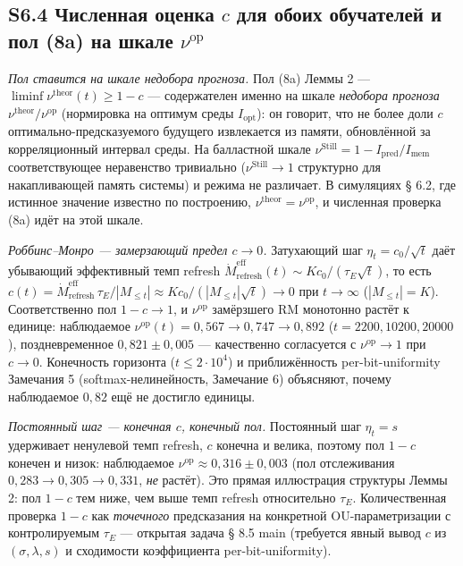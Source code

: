 \documentclass[pdflatex,sn-mathphys-ay]{sn-jnl}
\begin{document}
\subsection*{\texorpdfstring{S6.4 Численная оценка \(c\) для обоих обучателей и пол (8a) на шкале \(\nu^{\text{op}}\)}{S6.4 Численная оценка c для обоих обучателей и пол (8a) на шкале \textbackslash nu\^{}\{\textbackslash text\{op\}\}}}\label{s6.4-ux447ux438ux441ux43bux435ux43dux43dux430ux44f-ux43eux446ux435ux43dux43aux430-c-ux434ux43bux44f-ux43eux431ux43eux438ux445-ux43eux431ux443ux447ux430ux442ux435ux43bux435ux439-ux438-ux43fux43eux43b-8a-ux43dux430-ux448ux43aux430ux43bux435-nutextop}



\emph{Пол ставится на шкале недобора прогноза.} Пол (8a) Леммы 2 --- \(\liminf \nu^{\text{theor}}(t) \ge 1 - c\) --- содержателен именно на шкале \emph{недобора прогноза} \(\nu^{\text{theor}}/\nu^{\text{op}}\) (нормировка на оптимум среды \(I_{\text{opt}}\)): он говорит, что не более доли \(c\) оптимально-предсказуемого будущего извлекается из памяти, обновлённой за корреляционный интервал среды. На балластной шкале \(\nu^{\text{Still}} = 1 - I_{\text{pred}}/I_{\text{mem}}\) соответствующее неравенство тривиально (\(\nu^{\text{Still}} \to 1\) структурно для накапливающей память системы) и режима не различает. В симуляциях § 6.2, где истинное значение известно по построению, \(\nu^{\text{theor}} = \nu^{\text{op}}\), и численная проверка (8a) идёт на этой шкале.



\emph{Роббинс--Монро --- замерзающий предел \(c \to 0\).} Затухающий шаг \(\eta_t = c_0/\sqrt t\) даёт убывающий эффективный темп refresh \(\dot M_{\text{refresh}}^{\text{eff}}(t) \sim K c_0/(\tau_E\sqrt t)\), то есть \(c(t) = \dot M_{\text{refresh}}^{\text{eff}}\,\tau_E/|M_{\le t}| \approx K c_0/(|M_{\le t}|\sqrt t) \to 0\) при \(t \to \infty\) (\(|M_{\le t}| = K\)). Соответственно пол \(1 - c \to 1\), и \(\nu^{\text{op}}\) замёрзшего RM монотонно растёт к единице: наблюдаемое \(\nu^{\text{op}}(t) = 0{,}567 \to 0{,}747 \to 0{,}892\) (\(t = 2200, 10200, 20000\)), поздневременное \(0{,}821 \pm 0{,}005\) --- качественно согласуется с \(\nu^{\text{op}} \to 1\) при \(c \to 0\). Конечность горизонта (\(t \le 2\cdot10^4\)) и приближённость per-bit-uniformity Замечания 5 (softmax-нелинейность, Замечание 6) объясняют, почему наблюдаемое \(0{,}82\) ещё не достигло единицы.



\emph{Постоянный шаг --- конечная \(c\), конечный пол.} Постоянный шаг \(\eta_t = s\) удерживает ненулевой темп refresh, \(c\) конечна и велика, поэтому пол \(1 - c\) конечен и низок: наблюдаемое \(\nu^{\text{op}} \approx 0{,}316 \pm 0{,}003\) (пол отслеживания \(0{,}283 \to 0{,}305 \to 0{,}331\), \emph{не} растёт). Это прямая иллюстрация структуры Леммы 2: пол \(1 - c\) тем ниже, чем выше темп refresh относительно \(\tau_E\). Количественная проверка \(1-c\) как \emph{точечного} предсказания на конкретной OU-параметризации с контролируемым \(\tau_E\) --- открытая задача § 8.5 main (требуется явный вывод \(c\) из \((\sigma, \lambda, s)\) и сходимости коэффициента per-bit-uniformity).
\end{document}
